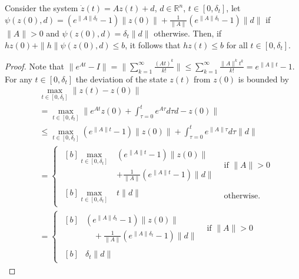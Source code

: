 \documentclass[10pt,a4paper]{amsart}
\begin{document}
\begin{lemma}                       
    Consider the system $\dot z(t)=Az(t) + d$, $d\in\mathbb{R}^n$, $t\in[0,\delta_t]$, let
    $\psi(z(0),d)=(e^{\|\!A\!\|\delta_t}\!-\!1)\|z(0)\|\!+\!\frac{1}{\|\!A\!\|}(e^{\|\!A\!\|\delta_t}\!-\!1) \|d\|$ if $\|A\|\!>\!0$ and $\psi(z(0),d) = \delta_t \|d\|$ otherwise. Then, if $hz(0)+\|h\|\psi(z(0),d)\leq b$, it follows that $hz(t)\leq b$ for all $t\in[0,\delta_t]$.
    \label{lem_ct_boundedness}
\end{lemma}

\begin{proof}
        Note that $\|e^{At}-I\| = \|\sum_{k=1}^{\infty}\frac{(At)^k}{k!}\|\leq\sum_{k=1}^{\infty}\frac{\|A\|^kt^k}{k!}=e^{\|A\|t}-1$. For any $t\in[0,\delta_t]$ the deviation of the state $z(t)$ from $z(0)$ is bounded by
    \begin{align*}
        &\max_{t\in[0,\delta_t]}\|z(t)-z(0)\|\\
        &= \max_{t\in[0,\delta_t]}\|e^{At}z(0) + \int_{\tau=0}^{t}e^{A\tau}d\tau d - z(0)\|
        \\
        &\leq \max_{t\in[0,\delta_t]}(e^{\|A\|t}\!-\!1)\|z(0)\|\!+\!\int_{\tau=0}^{t}e^{\|A\|\tau}d\tau \|d\| 
        \\&=\begin{cases}
            \begin{aligned}[b]
            \max_{t\in[0,\delta_t]}&(e^{\|A\|t}-1)\|z(0)\| \\
            &+\!\frac{1}{\|A\|}(e^{\|A\|t}\!-\!1)\|d\|
            \end{aligned}
            &\text{if } \|A\|\!>\!0 \\
            \begin{aligned}[b]
            \max_{t\in[0,\delta_t]}& t \|d\|
            \end{aligned}
            &\text{otherwise.}
        \end{cases}
        \\&
        =\begin{cases}
            \begin{aligned}[b]
            &(e^{\|A\|\delta_t}-1)\|z(0)\| \\
            &\quad\!+\!\frac{1}{\|A\|}(e^{\|A\|\delta_t}\!-\!1)\|d\|
            \end{aligned}
            &\text{if } \|A\|\!>\!0 \\
            \begin{aligned}[b]
            &\delta_t \|d\|
            \end{aligned}

\end{cases}
\end{align*}
\end{proof}
\end{document}
